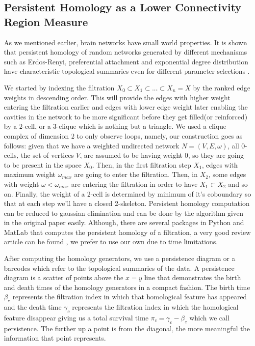\documentclass[9pt,twocolumn,twoside,lineno]{pnas-new}
\begin{document}
\subsection{Persistent Homology as a Lower Connectivity Region Measure}
As we mentioned earlier, brain networks have small world properties. It is shown that persistent homology of random networks generated by different mechanisms such as Erdos-Renyi, preferential attachment and exponential degree distribution have characteristic topological summaries even for different parameter selections \cite{pershomcompnetw}.

We started by indexing the filtration $X_{0}\subset X_{1}\subset ...\subset X_{n}=X$ by the ranked edge weights in descending order. This will provide the edges with higher weight entering the filtration earlier and edges with lower edge weight later enabling the cavities in the network to be more significant before they get filled(or reinforced) by a 2-cell, or a 3-clique which is nothing but a triangle. We used a clique complex of dimension 2 to only observe loops, namely, our construction goes as follows: given that we have a weighted undirected network $N=(V,E,\omega)$, all 0-cells, the set of vertices $V$, are assumed to be having weight $0$, so they are going to be present in the space $X_{0}$. Then, in the first filtration step $X_{1}$, edges with maximum weight $\omega_{max}$ are going to enter the filtration. Then, in $X_{2}$, some edges with weight $\omega<\omega_{max}$ are entering the filtration in order to have $X_{1}\subset X_{2}$ and so on. Finally, the weight of a 2-cell is determined by minimum of it's coboundary so that at each step we'll have a closed 2-skeleton. Persistent homology computation can be reduced to gaussian elimination and can be done by the algorithm given in the original paper\cite{zomorodian} easily. Although, there are several packages in Python and MatLab that computes the persistent homology of a filtration, a very good review article can be found \cite{roadmap}, we prefer to use our own due to time limitations.

After computing the homology generators, we use a persistence diagram or a barcodes \cite{barcode} which refer to the topological summaries of the data. A persistence diagram is a scatter of points above the $x=y$ line that demonstrates the birth and death times of the homology generators in a compact fashion. The birth time $\beta_{c}$ represents the filtration index in which that homological feature has appeared and the death time $\gamma_{c}$ represents the filtration index in which the homological feature disappear giving us a total survival time $\pi_{c}=\gamma_{c}-\beta_{c}$ which we call persistence.  The further up a point is from the diagonal, the more meaningful the information that point represents.
\end{document}
